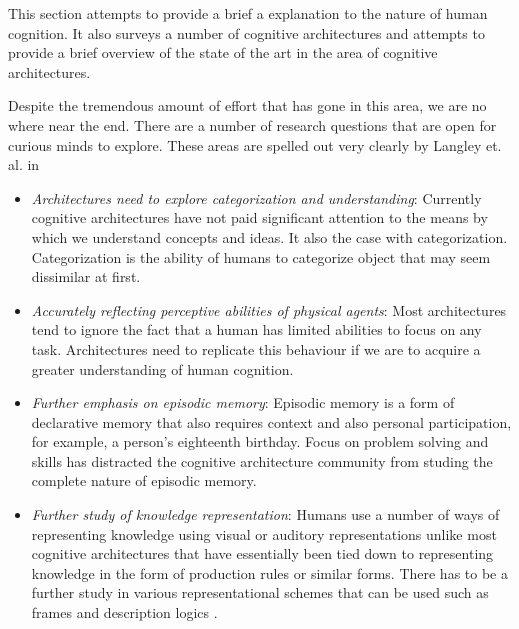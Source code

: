 This section attempts to provide a brief a explanation to the nature
of human cognition. It also surveys a number of cognitive
architectures and attempts to provide a brief overview of the state of
the art in the area of cognitive architectures. 


Despite the tremendous amount of effort that has gone in this area, we
are no where near the end. There are a number of research questions
that are open for curious minds to explore. These areas are spelled
out very clearly by Langley et. al. in \cite{citeulike:4182324}


\begin{itemize}
\item \emph{Architectures need to explore categorization and
    understanding}: Currently cognitive architectures have not paid
  significant attention to the means by which we understand concepts
  and ideas. It also the case with categorization. Categorization is
  the ability of humans to categorize object that may seem dissimilar
  at first. 
  
\item \emph{Accurately reflecting perceptive abilities of physical
    agents}: Most architectures tend to ignore the fact that a human
  has limited abilities to focus on any task. Architectures need to
  replicate this behaviour if we are to acquire a greater
  understanding of human cognition.

  \item \emph{Further emphasis on episodic memory}: Episodic memory is
    a form of declarative memory that also requires context and also
    personal participation\cite{09011999}, for example, a person's
    eighteenth birthday.  Focus on problem solving and skills has
    distracted the cognitive architecture community from studing the
    complete nature of episodic memory.

\item \emph{Further study of knowledge representation}: Humans use a
  number of ways of representing knowledge using visual or auditory
  representations unlike most cognitive architectures that have
  essentially been tied down to representing knowledge in the form of
  production rules or similar forms. There has to be a further study
  in various representational schemes that can be used such as
  frames\cite{Minsky1974a} and description logics
  \cite{nardi-brachman:2003a}. 


\end{itemize}
